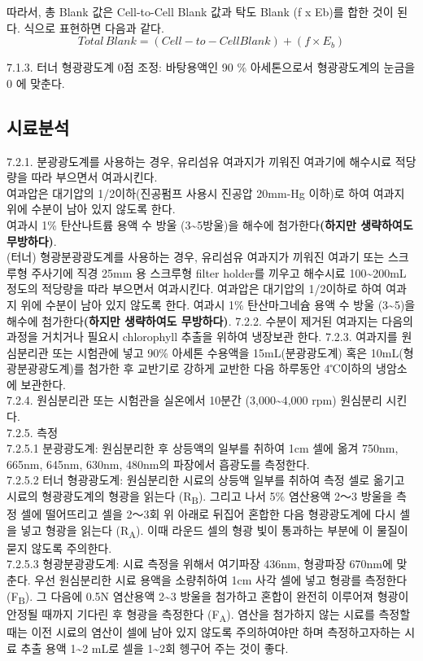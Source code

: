 \documentclass[
]{book}
\begin{document}
따라서, 총 Blank 값은 Cell-to-Cell Blank 값과 탁도 Blank (f x Eb)를 합한 것이 된다. 식으로 표현하면 다음과 같다.\\
\[Total\,Blank = (Cell-to-Cell Blank) + (f \times E_b)\]

7.1.3. 터너 형광광도계 0점 조정: 바탕용액인 90 \% 아세톤으로서 형광광도계의 눈금을 0 에 맞춘다.

\hypertarget{uxc2dcuxb8ccuxbd84uxc11d-2}{%
\subsection{시료분석}\label{uxc2dcuxb8ccuxbd84uxc11d-2}}

7.2.1. 분광광도계를 사용하는 경우, 유리섬유 여과지가 끼워진 여과기에 해수시료 적당량을 따라 부으면서 여과시킨다.\\
여과압은 대기압의 1/2이하(진공펌프 사용시 진공압 20mm-Hg 이하)로 하여 여과지 위에 수분이 남아 있지 않도록 한다.\\
여과시 1\% 탄산나트륨 용액 수 방울 (3\textasciitilde5방울)을 해수에 첨가한다\textbf{(하지만 생략하여도 무방하다)}.\\
(터너) 형광분광광도계를 사용하는 경우, 유리섬유 여과지가 끼워진 여과기 또는 스크루형 주사기에 직경 25mm 용 스크루형 filter holder를 끼우고 해수시료 100\textasciitilde200mL 정도의 적당량을 따라 부으면서 여과시킨다. 여과압은 대기압의 1/2이하로 하여 여과지 위에 수분이 남아 있지 않도록 한다. 여과시 1\% 탄산마그네슘 용액 수 방울 (3\textasciitilde5)을 해수에 첨가한다\textbf{(하지만 생략하여도 무방하다)}.
7.2.2. 수분이 제거된 여과지는 다음의 과정을 거치거나 필요시 chlorophyll 추출을 위하여 냉장보관 한다.
7.2.3. 여과지를 원심분리관 또는 시험관에 넣고 90\% 아세톤 수용액을 15mL(분광광도계) 혹은 10mL(형광분광광도계)를 첨가한 후 교반기로 강하게 교반한 다음 하루동안 4℃이하의 냉암소에 보관한다.\\
7.2.4. 원심분리관 또는 시험관을 실온에서 10분간 (3,000\textasciitilde4,000 rpm) 원심분리 시킨다.\\
7.2.5. 측정\\
7.2.5.1 분광광도계: 원심분리한 후 상등액의 일부를 취하여 1cm 셀에 옮겨 750nm, 665nm, 645nm, 630nm, 480nm의 파장에서 흡광도를 측정한다.\\
7.2.5.2 터너 형광광도계: 원심분리한 시료의 상등액 일부를 취하여 측정 셀로 옮기고 시료의 형광광도계의 형광을 읽는다 (R\textsubscript{B}). 그리고 나서 5\% 염산용액 2～3 방울을 측정 셀에 떨어뜨리고 셀을 2～3회 위 아래로 뒤집어 혼합한 다음 형광광도계에 다시 셀을 넣고 형광을 읽는다 (R\textsubscript{A}). 이때 라운드 셀의 형광 빛이 통과하는 부분에 이 물질이 묻지 않도록 주의한다.\\
7.2.5.3 형광분광광도계: 시료 측정을 위해서 여기파장 436nm, 형광파장 670nm에 맞춘다. 우선 원심분리한 시료 용액을 소량취하여 1cm 사각 셀에 넣고 형광를 측정한다 (F\textsubscript{B}). 그 다음에 0.5N 염산용액 2\textasciitilde3 방울을 첨가하고 혼합이 완전히 이루어져 형광이 안정될 때까지 기다린 후 형광을 측정한다 (F\textsubscript{A}). 염산을 첨가하지 않는 시료를 측정할 때는 이전 시료의 염산이 셀에 남아 있지 않도록 주의하여야만 하며 측정하고자하는 시료 추출 용액 1\textasciitilde2 mL로 셀을 1\textasciitilde2회 헹구어 주는 것이 좋다.
\end{document}
